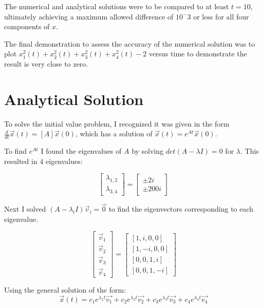 \documentclass[11pt, oneside]{article}   	%
\begin{document}
The numerical and analytical solutions were to be compared to at least $t = 10$, ultimately achieving a maximum allowed difference of $10^-3$ or less for all four components of $x$.

The final demonstration to assess the accuracy of the numerical solution was to plot $x^2_1(t) + x^2_2(t) + x^2_3(t) + x^2_4(t) - 2$ versus time to demonstrate the result is very close to zero.



\section{Analytical Solution}
To solve the initial value problem, I recognized it was given in the form $\frac{d}{dt}\vec{x}(t) = [A]\vec{x}(0)$, which has a solution of $\vec{x}(t) = e^{At}\vec{x}(0)$.

To find $e^{At}$ I found the eigenvalues of $A$ by solving $det(A-\lambda I) = 0$ for $\lambda$. This resulted in 4 eigenvalues:



\[
\left[
\begin{array}{cccc}
\lambda_{1,2} \\
\lambda_{3,4}
\end{array}
\right]
=
\left[
\begin{array}{cccc}
\pm 2i \\
\pm 200i
\end{array}
\right]
\]

Next I solved $(A - \lambda_iI)\vec{v}_i = \vec{0}$  to find the eigenvectors corresponding to each eigenvalue.

\[
\left[
\begin{array}{cccc}
\vec{v}_1\\
\vec{v}_2\\
\vec{v}_3\\
\vec{v}_4
\end{array}
\right]
=
\left[
\begin{array}{cccc}
\left[1, i, 0, 0\right] \\
\left[1, -i, 0, 0\right] \\
\left[0, 0, 1, i\right] \\
\left[0, 0, 1, -i\right]
\end{array}
\right]
\]



Using the general solution of the form:\\
\[
\vec{x}(t) = c_1e^{\lambda_1t}\vec{v_1} + c_2e^{\lambda_2t}\vec{v_2} + c_3e^{\lambda_3t}\vec{v_3} + c_4e^{\lambda_4t}\vec{v_4}
\]
\end{document}
